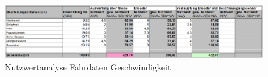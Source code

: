 \documentclass[../../main.tex]{subfiles}
\begin{document}
    \begin{figure}[H]
        \centering
        \includegraphics[width=1.0\textwidth]{Nutzweranalyse_Fahrdaten_Geschwindigkeit.png}
        \caption {Nutzwertanalyse Fahrdaten Geschwindigkeit}
        \label{fig:fahr_nutzwertanalyse_geschwindigkeit}
    \end{figure}

    
\end{document}
